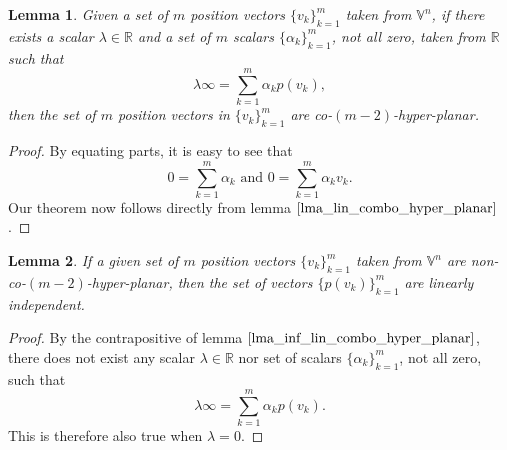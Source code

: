 \documentclass[12pt]{article}
\newcommand{\V}{\mathbb{V}}
\newcommand{\R}{\mathbb{R}}
\newcommand{\nvai}{\infty}
\newtheorem{lemma}{Lemma}[section]
\begin{document}
\begin{lemma}\label{lma_inf_lin_combo_hyper_planar}
Given a set of $m$ position vectors $\{v_k\}_{k=1}^m$ taken from $\V^n$,
if there exists a scalar $\lambda\in\R$ and a set of $m$ scalars
$\{\alpha_k\}_{k=1}^m$, not all zero, taken from $\R$ such that
\begin{equation*}
\lambda\nvai = \sum_{k=1}^m\alpha_k p(v_k),
\end{equation*}
then the set of $m$ position vectors in $\{v_k\}_{k=1}^m$ are co-$(m-2)$-hyper-planar.
\end{lemma}
\begin{proof}
By equating parts, it is easy to see that
\begin{equation*}
\mbox{$0 = \sum_{k=1}^m\alpha_k$ and $0=\sum_{k=1}^m\alpha_k v_k$.}
\end{equation*}
Our theorem now follows directly from lemma $\eqref{lma_lin_combo_hyper_planar}$.
\end{proof}

\begin{lemma}\label{lma_cor_non_hyper_planar_lin_indep}
If a given set of $m$ position vectors $\{v_k\}_{k=1}^m$ taken from $\V^n$
are non-co-$(m-2)$-hyper-planar, then the set of vectors $\{p(v_k)\}_{k=1}^m$
are linearly independent.
\end{lemma}
\begin{proof}
By the contrapositive of lemma $\eqref{lma_inf_lin_combo_hyper_planar}$,
there does not exist any scalar $\lambda\in\R$ nor set of scalars
$\{\alpha_k\}_{k=1}^m$, not all zero, such that
\begin{equation*}
\lambda\nvai = \sum_{k=1}^m\alpha_k p(v_k).
\end{equation*}
This is therefore also true when $\lambda=0$.
\end{proof}
\end{document}
